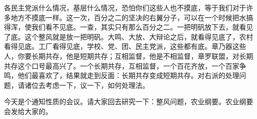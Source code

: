 各民主党派什么情况，基层什么情况，恐怕你们这些人也不摸底，等于我们对于许多地方不摸底一样。这一次，百分之二的坚决的右翼分子，可以在一个时候把水搞得浑，使我们看不见底。一查，其实只有那么百分之二。一把明矾放下去，就看见了底。这个整风就是放一把明矾。大鸣、大放、大辩论之后，就看得见底了，农村看得见底。工厂看得见底，学校、党、团、民主党派，这些都有底。章乃器这些人，你要长期共存，他是短期共存；互相监督，他是不相监督，章罗联盟，对长期共存这个口号最高兴了。一个长期共存，互相监督，一个百花齐放，一个百家争鸣，他们最喜欢了，结果就走到反面：长期共存变成短期共存。对右派的处理问题，请诸位去考虑一下，议一下，如何处理法。

今天是个通知性质的会议。请大家回去研究一下：整风问题，农业纲要。农业纲要会发给大家的。


